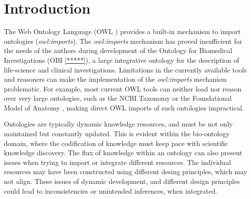 \documentclass[a4paper,10pt,twocolumn]{article}
\newcommand{\protege}{Prot\'{e}g\'{e}}
\begin{document}
\section*{Introduction}
\label{intro}
The Web Ontology Language (OWL \cite{RefWorks:1506}) provides a built-in mechanism to import ontologies (\emph{owl:imports}).
The \emph{owl:imports} mechanism has proved insufficient for the needs of the authors during development of the Ontology for Biomedical Investigations (OBI \ref{*****}), a large integrative ontology for the description of life-science and clinical investigations.
Limitations in the currently available tools and reasoners can make the implementation of the \emph{owl:imports} mechanism problematic.
For example, most current OWL tools can neither load nor reason over very large ontologies, such as the NCBI Taxonomy \cite{RefWorks:1502} or the Foundational Model of Anatomy \cite{RefWorks:1558}, making direct OWL imports of such ontologies impractical.




Ontologies are typically dynamic knowledge resources, and must be not only maintained but constantly updated.
This is evident within the bio-ontology domain, where the codification of knowledge must keep pace with scientific knowledge discovery.
The flux of knowledge within an ontology can also present issues when trying to import or integrate different resources.
The individual resources may have been constructed using different desing principles, which may not align.
These issues of dynamic development, and different design principles could lead to inconsistencies or unintended inferences, when integrated.
\end{document}
